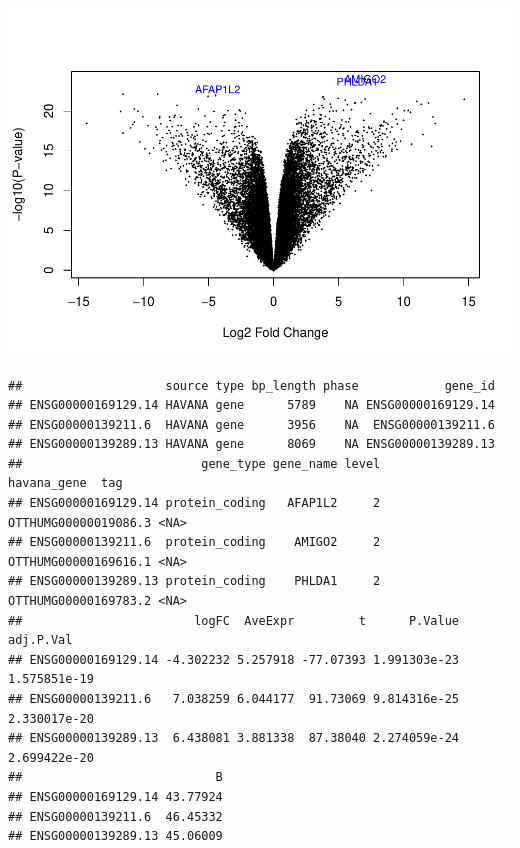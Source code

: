 \documentclass[
]{article}
\newenvironment{Shaded}{\begin{snugshade}}{\end{snugshade}}
\newcommand{\CommentTok}[1]{\textcolor[rgb]{0.56,0.35,0.01}{\textit{#1}}}
\newcommand{\FunctionTok}[1]{\textcolor[rgb]{0.13,0.29,0.53}{\textbf{#1}}}
\newcommand{\NormalTok}[1]{#1}
\newcommand{\SpecialCharTok}[1]{\textcolor[rgb]{0.81,0.36,0.00}{\textbf{#1}}}
\newcommand{\StringTok}[1]{\textcolor[rgb]{0.31,0.60,0.02}{#1}}
\begin{document}
\includegraphics{Proyecto_RNAseq_files/figure-latex/unnamed-chunk-15-1.pdf}

\begin{Shaded}
\end{Shaded}

\begin{verbatim}
##                    source type bp_length phase            gene_id
## ENSG00000169129.14 HAVANA gene      5789    NA ENSG00000169129.14
## ENSG00000139211.6  HAVANA gene      3956    NA  ENSG00000139211.6
## ENSG00000139289.13 HAVANA gene      8069    NA ENSG00000139289.13
##                         gene_type gene_name level          havana_gene  tag
## ENSG00000169129.14 protein_coding   AFAP1L2     2 OTTHUMG00000019086.3 <NA>
## ENSG00000139211.6  protein_coding    AMIGO2     2 OTTHUMG00000169616.1 <NA>
## ENSG00000139289.13 protein_coding    PHLDA1     2 OTTHUMG00000169783.2 <NA>
##                        logFC  AveExpr         t      P.Value    adj.P.Val
## ENSG00000169129.14 -4.302232 5.257918 -77.07393 1.991303e-23 1.575851e-19
## ENSG00000139211.6   7.038259 6.044177  91.73069 9.814316e-25 2.330017e-20
## ENSG00000139289.13  6.438081 3.881338  87.38040 2.274059e-24 2.699422e-20
##                           B
## ENSG00000169129.14 43.77924
## ENSG00000139211.6  46.45332
## ENSG00000139289.13 45.06009
\end{verbatim}
\end{document}
